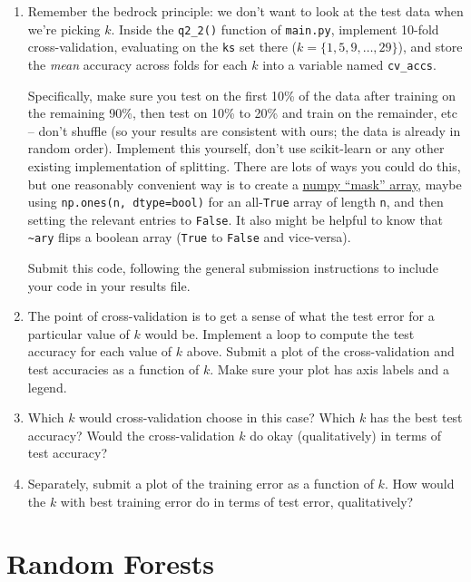 \documentclass{article}
\def\blu#1{{\color{blu}#1}}
\let\ask\blu
\begin{document}
\begin{enumerate}
    \item Remember the bedrock principle: we don't want to look at the test data when we're picking $k$. Inside the \texttt{q2\_2()} function of \texttt{main.py}, implement 10-fold cross-validation, evaluating on the \texttt{ks} set there ($k = \{1, 5, 9, \dots, 29\}$), and store the \emph{mean} accuracy across folds for each $k$ into a variable named \texttt{cv\_accs}.

    Specifically, make sure you test on the first 10\% of the data after training on the remaining 90\%, then test on 10\% to 20\% and train on the remainder, etc -- don't shuffle (so your results are consistent with ours; the data is already in random order). Implement this yourself, don't use scikit-learn or any other existing implementation of splitting. There are lots of ways you could do this, but one reasonably convenient way is to create a \href{https://numpy.org/doc/stable/user/basics.indexing.html#boolean-or-mask-index-arrays}{numpy ``mask'' array}, maybe using \texttt{np.ones(n, dtype=bool)} for an all-\texttt{True} array of length \texttt{n}, and then setting the relevant entries to \texttt{False}. It also might be helpful to know that \texttt{\textasciitilde ary} flips a boolean array (\texttt{True} to \texttt{False} and vice-versa).

    \blu{Submit this code}, following the general submission instructions to include your code in your results file.

    \item The point of cross-validation is to get a sense of what the test error for a particular value of $k$ would be. Implement a loop to compute the test accuracy for each value of $k$ above. \ask{Submit a plot of the cross-validation and test accuracies as a function of $k$.} Make sure your plot has axis labels and a legend.
    \item Which $k$ would cross-validation choose in this case? Which $k$ has the best test accuracy? Would the cross-validation $k$ do okay (qualitatively) in terms of test accuracy?
    \item Separately, \ask{submit a plot of the training error as a function of $k$. How would the $k$ with best training error do in terms of test error, qualitatively?}
    
\end{enumerate}

\pagebreak

\section{Random Forests}
\end{document}
